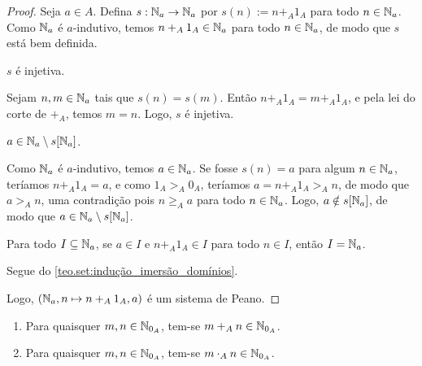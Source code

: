 \begin{proof}
    Seja $a \in A$. Defina $s : \mathbb{N}_{a} \to \mathbb{N}_{a}$ por $s(n) := n +_{A} 1_{A}$ para todo $n \in \mathbb{N}_{a}$. Como $\mathbb{N}_{a}$ é $a$-indutivo, temos $n +_{A} 1_{A} \in \mathbb{N}_{a}$ para todo $n \in \mathbb{N}_{a}$, de modo que $s$ está bem definida.
        \begin{claim}
            $s$ é injetiva.
        \end{claim}
        \begin{midproof}
            Sejam $n,m \in \mathbb{N}_{a}$ tais que $s(n) = s(m)$. Então $n +_{A} 1_{A} = m +_{A} 1_{A}$, e pela lei do corte de $+_{A}$, temos $m=n$. Logo, $s$ é injetiva.    
        \end{midproof}
        \begin{claim}
            $a \in \mathbb{N}_{a} \setminus s[\mathbb{N}_{a}]$.
        \end{claim}
        \begin{midproof}
            Como $\mathbb{N}_{a}$ é $a$-indutivo, temos $a \in \mathbb{N}_{a}$. Se fosse $s(n) = a$ para algum $n \in \mathbb{N}_{a}$, teríamos $n +_{A} 1_{A} = a$, e como $1_{A} >_{A} 0_{A}$, teríamos $a = n +_{A} 1_{A} >_{A} n$, de modo que $a >_{A} n$, uma contradição pois $n \geq_{A} a$ para todo $n \in \mathbb{N}_{a}$. Logo, $a \notin s[\mathbb{N}_{a}]$, de modo que $a \in \mathbb{N}_{a} \setminus s[\mathbb{N}_{a}]$. \whiteproof
        \end{midproof}
        \begin{claim}
            Para todo $I \subseteq \mathbb{N}_{a}$, se $a \in I$ e $n +_{A} 1_{A} \in I$ para todo $n \in I$, então $I = \mathbb{N}_{a}$.
        \end{claim}
        \begin{midproof}
            Segue do \cref{teo.set:indução_imersão_domínios}. \whiteproof
        \end{midproof}
    Logo, $(\mathbb{N}_{a}, n \mapsto n +_{A} 1_{A}, a)$ é um sistema de Peano. \blackproof
\end{proof}

\begin{proposition}
    \leavevmode
        \begin{enumerate}[leftmargin=*, align=left, label=\textbf{(\alph*)}]
            \item Para quaisquer $m,n \in \mathbb{N}_{0_{A}}$, tem-se $m +_{A} n \in \mathbb{N}_{0_{A}}$.
            \item Para quaisquer $m,n \in \mathbb{N}_{0_{A}}$, tem-se $m \cdot_{A} n \in \mathbb{N}_{0_{A}}$.
        \end{enumerate}
\end{proposition}

